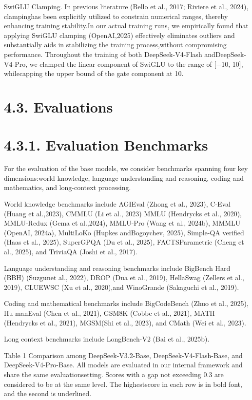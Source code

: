 \documentclass[
  10
]{article}
\begin{document}
SwiGLU Clamping. In previous literature (Bello et al., 2017; Riviere et
al., 2024), clampinghas been explicitly utilized to constrain numerical
ranges, thereby enhancing training stability.In our actual training
runs, we empirically found that applying SwiGLU clamping (OpenAI,2025)
effectively eliminates outliers and substantially aids in stabilizing
the training process,without compromising performance. Throughout the
training of both DeepSeek-V4-Flash andDeepSeek-V4-Pro, we clamped the
linear component of SwiGLU to the range of {[}−10, 10{]}, whilecapping
the upper bound of the gate component at 10.

\section{4.3. Evaluations}\label{evaluations}

\section{4.3.1. Evaluation Benchmarks}\label{evaluation-benchmarks}

For the evaluation of the base models, we consider benchmarks spanning
four key dimensions:world knowledge, language understanding and
reasoning, coding and mathematics, and long-context processing.

World knowledge benchmarks include AGIEval (Zhong et al., 2023), C-Eval
(Huang et al.,2023), CMMLU (Li et al., 2023) MMLU (Hendrycks et al.,
2020), MMLU-Redux (Gema et al.,2024), MMLU-Pro (Wang et al., 2024b),
MMMLU (OpenAI, 2024a), MultiLoKo (Hupkes andBogoychev, 2025), Simple-QA
verified (Haas et al., 2025), SuperGPQA (Du et al., 2025),
FACTSParametric (Cheng et al., 2025), and TriviaQA (Joshi et al., 2017).

Language understanding and reasoning benchmarks include BigBench Hard
(BBH) (Suzgunet al., 2022), DROP (Dua et al., 2019), HellaSwag (Zellers
et al., 2019), CLUEWSC (Xu et al., 2020),and WinoGrande (Sakaguchi et
al., 2019).

Coding and mathematical benchmarks include BigCodeBench (Zhuo et al.,
2025), Hu-manEval (Chen et al., 2021), GSM8K (Cobbe et al., 2021), MATH
(Hendrycks et al., 2021), MGSM(Shi et al., 2023), and CMath (Wei et al.,
2023).

Long context benchmarks include LongBench-V2 (Bai et al., 2025b).

Table 1 \textbar{} Comparison among DeepSeek-V3.2-Base,
DeepSeek-V4-Flash-Base, and DeepSeek-V4-Pro-Base. All models are
evaluated in our internal framework and share the same
evaluationsetting. Scores with a gap not exceeding 0.3 are considered to
be at the same level. The highestscore in each row is in bold font, and
the second is underlined.
\end{document}

